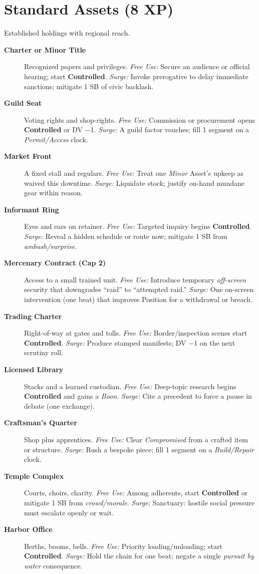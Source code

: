 \section{Standard Assets (8 XP)}
Established holdings with regional reach.
\begin{description}
  \item[\textbf{Charter or Minor Title}]  Recognized papers and privileges. \emph{Free Use:} Secure an audience or official hearing; start \textbf{Controlled}. \emph{Surge:} Invoke prerogative to delay immediate sanctions; mitigate 1 SB of civic backlash.
  \item[\textbf{Guild Seat}]  Voting rights and shop-rights. \emph{Free Use:} Commission or procurement opens \textbf{Controlled} or DV −1. \emph{Surge:} A guild factor vouches; fill 1 segment on a \emph{Permit/Access} clock.
  \item[\textbf{Market Front}]  A fixed stall and regulars. \emph{Free Use:} Treat one \emph{Minor} Asset’s upkeep as waived this downtime. \emph{Surge:} Liquidate stock; justify on-hand mundane gear within reason.
  \item[\textbf{Informant Ring}]  Eyes and ears on retainer. \emph{Free Use:} Targeted inquiry begins \textbf{Controlled}. \emph{Surge:} Reveal a hidden schedule or route now; mitigate 1 SB from \emph{ambush/surprise}.
  \item[\textbf{Mercenary Contract (Cap 2)}]  Access to a small trained unit. \emph{Free Use:} Introduce temporary \emph{off-screen} security that downgrades “raid” to “attempted raid.” \emph{Surge:} One on-screen intervention (one beat) that improves Position for a withdrawal or breach.
  \item[\textbf{Trading Charter}]  Right-of-way at gates and tolls. \emph{Free Use:} Border/inspection scenes start \textbf{Controlled}. \emph{Surge:} Produce stamped manifests; DV −1 on the next scrutiny roll.
  \item[\textbf{Licensed Library}]  Stacks and a learned custodian. \emph{Free Use:} Deep-topic research begins \textbf{Controlled} and gains a \emph{Boon}. \emph{Surge:} Cite a precedent to force a pause in debate (one exchange).
  \item[\textbf{Craftsman’s Quarter}]  Shop plus apprentices. \emph{Free Use:} Clear \emph{Compromised} from a crafted item or structure. \emph{Surge:} Rush a bespoke piece; fill 1 segment on a \emph{Build/Repair} clock.
  \item[\textbf{Temple Complex}]  Courts, choirs, charity. \emph{Free Use:} Among adherents, start \textbf{Controlled} or mitigate 1 SB from \emph{crowd/morale}. \emph{Surge:} Sanctuary: hostile social pressure must escalate openly or wait.
  \item[\textbf{Harbor Office}]  Berths, booms, bells. \emph{Free Use:} Priority loading/unloading; start \textbf{Controlled}. \emph{Surge:} Hold the chain for one beat; negate a single \emph{pursuit by water} consequence.
\end{description}

